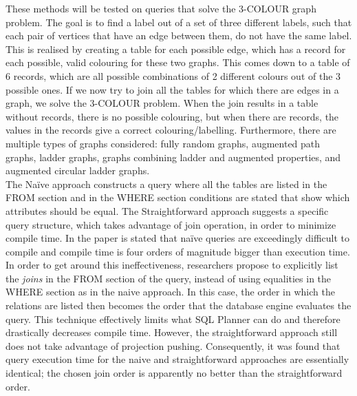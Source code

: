 These methods will be tested on queries that solve the 3-COLOUR graph problem. The goal is to find a label out of a set of three different labels, such that each pair of vertices that have an edge between them, do not have the same label. This is realised by creating a table for each possible edge, which has a record for each possible, valid colouring for these two graphs. This comes down to a table of 6 records, which are all possible combinations of 2 different colours out of the 3 possible ones. If we now try to join all the tables for which there are edges in a graph, we solve the 3-COLOUR problem. When the join results in a table without records, there is no possible colouring, but when there are records, the values in the records give a correct colouring/labelling. Furthermore, there are multiple types of graphs considered: fully random graphs, augmented path graphs, ladder graphs, graphs combining ladder and augmented properties, and augmented circular ladder graphs. \\

The Na\"ive approach constructs a query where all the tables are listed in the FROM section and in the WHERE section conditions are stated that show which attributes should be equal. The Straightforward approach suggests a specific query structure, which takes advantage of join operation, in order to minimize compile time. In the paper is stated that na\"ive queries are exceedingly difficult to compile and compile time is four orders of magnitude bigger than execution time. In order to get around this ineffectiveness, researchers propose to explicitly list the \textit{joins} in the FROM section of the query, instead of using equalities in the WHERE section as in the naive approach. In this case, the order in which the relations are listed then becomes the order that the database engine evaluates the query. This technique effectively limits what SQL Planner can do and therefore drastically decreases compile time. However, the straightforward approach still does not take advantage of projection pushing. Consequently, it was found that query execution time for the naive and straightforward approaches are essentially identical; the chosen join order is apparently no better than the straightforward order. \\

